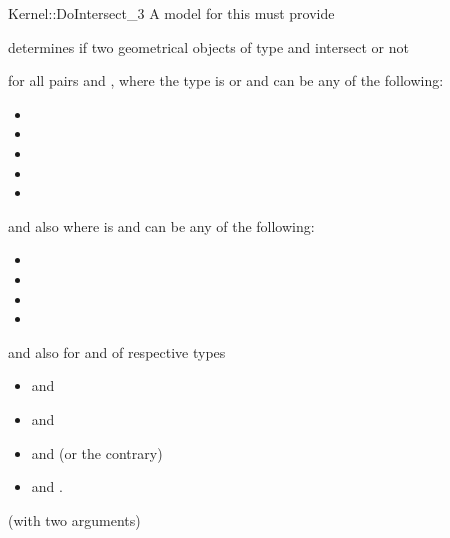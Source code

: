 \begin{ccRefFunctionObjectConcept}{Kernel::DoIntersect_3}
A model for this must provide


{determines if two geometrical objects of type 
 and  intersect or not}

for all pairs  and , where
the type  is  or
 and 
 can be any of the following:
\begin{itemize}
\item {}
\item {}
\item {}
\item {}
\item {}
\end{itemize}
and also where  is  and  can be any of the following:
\begin{itemize}
\item {}
\item {}
\item {}
\item {}
\end{itemize}
and also for  and  of respective types
\begin{itemize}
\item {} and 
\item {} and 
\item {} and  (or the contrary)
\item {} and .
\end{itemize}

\ccRefines
{} (with two arguments)

\ccSeeAlso
{}\\

\end{ccRefFunctionObjectConcept}
